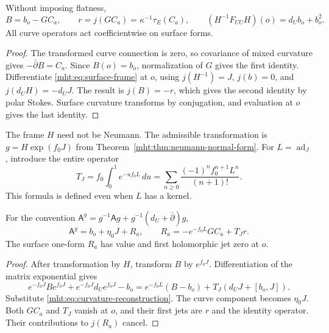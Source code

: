 \begin{proposition}\label{mht:prop:curvature-reconstruction}
Without imposing flatness,
\begin{equation}\label{mht:eq:curvature-reconstruction}
 B=b_o-GC_a,\qquad
 r=j(GC_a)=\kappa^{-1}\tau_E(C_a),\qquad
 (H^{-1}F_{UU}H)(o)=d_Ub_o+b_o^2.
\end{equation}
All curve operators act coefficientwise on surface forms.
\end{proposition}

\begin{proof}
The transformed curve connection is zero, so covariance of mixed
curvature gives $-\bar\partial B=C_a$. Since $B(o)=b_o$, normalization
of $G$ gives the first identity. Differentiate
\eqref{mht:eq:surface-frame} at $o$, using
$j(H^{-1})=J$, $j(b)=0$, and $j(d_UH)=-d_UJ$.
The result is $j(B)=-r$, which gives the second identity by polar Stokes.
Surface curvature transforms by conjugation, and evaluation at $o$
gives the last identity.
\end{proof}

The frame $H$ need not be Neumann. The admissible transformation is
$g=H\exp(f_0J)$ from Theorem~\ref{mht:thm:neumann-normal-form}.
For $L=\operatorname{ad}_J$, introduce the entire operator
\begin{equation}\label{mht:eq:entire-adjoint-operator}
 T_J=f_0\int_0^1e^{-u f_0L}\,du
       =\sum_{n\geq0}\frac{(-1)^nf_0^{n+1}L^n}{(n+1)!}.
\end{equation}
This formula is defined even when $L$ has a kernel.

\begin{corollary}\label{mht:cor:full-normal-error}
For the convention
$\mathsf A^g=g^{-1}\mathsf A g+g^{-1}(d_U+\bar\partial)g$,
\begin{equation}\label{mht:eq:full-normal-error}
 \mathsf A^g=b_o+\eta_0J+R_a,\qquad
 R_a=-e^{-f_0L}GC_a+T_Jr.
\end{equation}
The surface one-form $R_a$ has value and first holomorphic jet zero at
$o$.
\end{corollary}

\begin{proof}
After transformation by $H$, transform $B$ by $e^{f_0J}$.
Differentiation of the matrix exponential gives
\[
 e^{-f_0J}Be^{f_0J}+e^{-f_0J}d_Ue^{f_0J}-b_o
   =e^{-f_0L}(B-b_o)+T_J(d_UJ+[b_o,J]).
\]
Substitute \eqref{mht:eq:curvature-reconstruction}.
The curve component becomes $\eta_0J$.
Both $GC_a$ and $T_J$ vanish at $o$, and their first jets are $r$ and
the identity operator. Their contributions to $j(R_a)$ cancel.
\end{proof}

